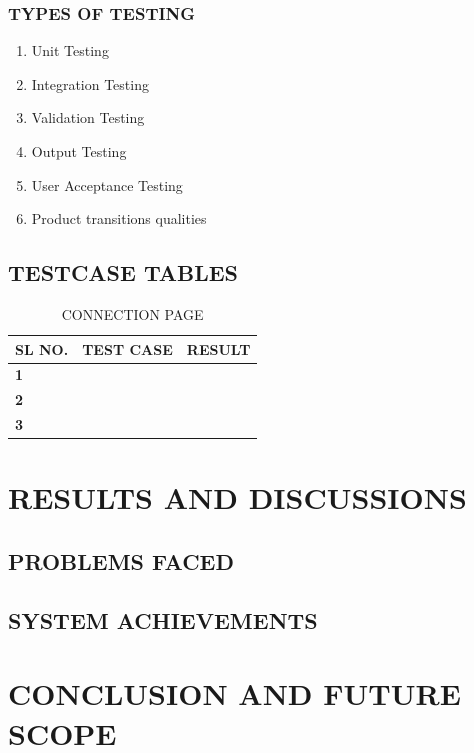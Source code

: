 \documentclass[11pt]{report} %
\begin{document}
\subsection{TYPES OF TESTING}
\label{subsec:TYPES OF TESTING}

\begin{enumerate}
	\item Unit Testing 
	\item Integration Testing
	\item Validation Testing 
	\item Output Testing 
	\item User Acceptance Testing 
	\item Product transitions qualities 
\end{enumerate}

\section{TESTCASE TABLES}
\label{sec:TESTCASE TABLES}

\begin{table}[h]
	\centering
	\caption{CONNECTION PAGE}
	\label{tab:CONNECTION PAGE}
	\begin{tabular}{|l|l|l|}
		\hline
		\textbf{SL NO.} & \textbf{TEST CASE} & \textbf{RESULT} \\ \hline
		\textbf{1}      & \textbf{}          & \textbf{}       \\ \hline
		\textbf{2}      & \textbf{}          & \textbf{}       \\ \hline
		\textbf{3}      & \textbf{}          & \textbf{}       \\ \hline
	\end{tabular}
\end{table}


\chapter{RESULTS AND DISCUSSIONS}

\section{PROBLEMS FACED}

\section{SYSTEM ACHIEVEMENTS}


\chapter{CONCLUSION AND FUTURE SCOPE}
\end{document}
